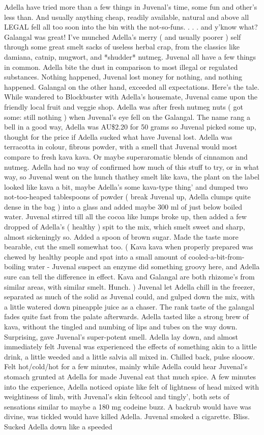 \documentclass[12pt]{book}
\begin{document}
Adella have tried more than a few things in Juvenal's time, some fun and other's less than. And usually anything cheap, readily available, natural and above all LEGAL fell all too soon into the bin with the not-so-funs.  . . . and y'know what? Galangal was great! I've munched Adella's merry ( and usually poorer ) self through some great smelt sacks of useless herbal crap, from the classics like damiana, catnip, mugwort, and *shudder* nutmeg. Juvenal all have a few things in common. Adella bite the dust in comparison to most illegal or regulated substances. Nothing happened, Juvenal lost money for nothing, and nothing happened. Galangal on the other hand, exceeded all expectations. Here's the tale. While wandered to Blockbuster with Adella's housemate, Juvenal came upon the friendly local fruit and veggie shop. Adella was after fresh nutmeg nuts ( got some: still nothing ) when Juvenal's eye fell on the Galangal. The name rang a bell in a good way, Adella was AU\$2.20 for 50 grams so Juvenal picked some up, thought for the price if Adella sucked what have Juvenal lost. Adella was terracotta in colour, fibrous powder, with a smell that Juvenal would most compare to fresh kava kava. Or maybe superaromatic blends of cinnamon and nutmeg. Adella had no way of confirmed how much of this stuff to try, or in what way, so Juvenal went on the hunch thathey smelt like kava, the plant on the label looked like kava a bit, maybe Adella's some kava-type thing' and dumped two not-too-heaped tablespoons of powder ( break Juvenal up, Adella clumps quite dense in the bag ) into a glass and added maybe 300 ml of just below boiled water. Juvenal stirred till all the cocoa like lumps broke up, then added a few dropped of Adella's ( healthy ) spit to the mix, which smelt sweet and sharp, almost sickeningly so. Added a spoon of brown sugar. Made the taste more bearable, cut the smell somewhat too. ( Kava kava when properly prepared was chewed by healthy people and spat into a small amount of cooled-a-bit-from-boiling water - Juvenal suspect an enzyme did something groovy here, and Adella sure can tell the difference in effect. Kava and Galangal are both rhizome's from similar areas, with similar smelt. Hunch. ) Juvenal let Adella chill in the freezer, separated as much of the solid as Juvenal could, and gulped down the mix, with a little watered down pineapple juice as a chaser. The rank taste of the galangal fades quite fast from the palate afterwards. Adella tasted like a strong brew of kava, without the tingled and numbing of lips and tubes on the way down. Surprising, gave Juvenal's super-potent smell. Adella lay down, and almost immediately felt Juvenal was experienced the effects of something akin to a little drink, a little weeded and a little salvia all mixed in. Chilled back, pulse slooow. Felt hot/cold/hot for a few minutes, mainly while Adella could hear Juvenal's stomach grunted at Adella for made Juvenal eat that much spice. A few minutes into the experience, Adella noticed opiate like felt of lightness of head mixed with weightiness of limb, with Juvenal's skin feltcool and tingly', both sets of sensations similar to maybe a 180 mg codeine buzz. A backrub would have was divine, was tickled would have killed Adella. Juvenal smoked a cigarette. Bliss. Sucked Adella down like a speeded 
\end{document}
